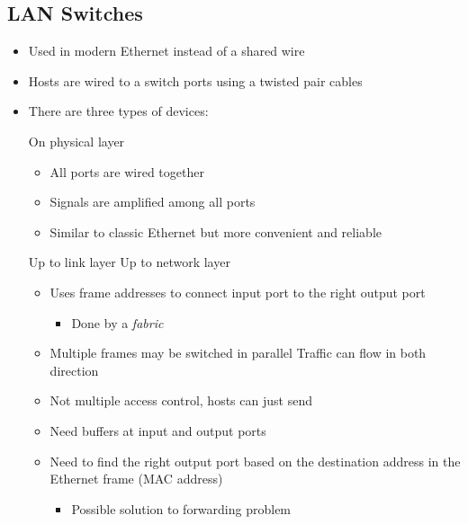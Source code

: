 \subsection{LAN Switches}
\begin{itemize}
    \item Used in modern Ethernet instead of a shared wire
    \item Hosts are wired to a switch ports using a twisted pair cables
    \item There are three types of devices:
        \begin{itemize}
             On physical layer
                \begin{itemize}
                    \item All ports are wired together
                    \item Signals are amplified among all ports
                    \item Similar to classic Ethernet but more convenient and reliable
                \end{itemize}
             Up to link layer
             Up to network layer
        \end{itemize}
        \begin{itemize}
            \item Uses frame addresses to connect input port to the right output port
                \begin{itemize}
                    \item Done by a \textit{fabric}
                \end{itemize}
            \item Multiple frames may be switched in parallel
             Traffic can flow in both direction
            \item Not multiple access control, hosts can just send
            \item Need buffers at input and output ports
        \end{itemize}
        \begin{itemize}
            \item Need to find the right output port based on the destination address in the Ethernet frame (MAC address)
                \begin{itemize}
                    \item Possible solution to forwarding problem

\end{itemize}
\end{itemize}
\end{itemize}
